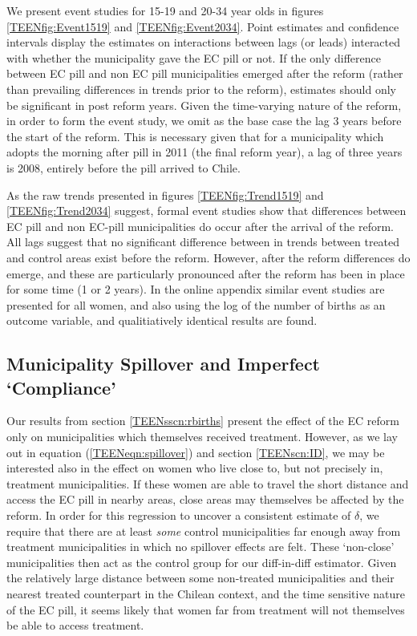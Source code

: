 We present event studies for 15-19 and 20-34 year olds in figures 
\ref{TEENfig:Event1519} and \ref{TEENfig:Event2034}.  Point estimates and 
confidence intervals display the estimates on interactions between lags (or 
leads) interacted with whether the municipality gave the EC pill or not.  If the
only difference between EC pill and non EC pill municipalities emerged after the
reform (rather than prevailing differences in trends prior to the reform), 
estimates should only be significant in post reform years. Given the time-varying
nature of the reform, in order to form the event study, we omit as the base case
the lag 3 years before the start of the reform.  This is necessary given that for
a municipality which adopts the morning after pill in 2011 (the final reform 
year), a lag of three years is 2008, entirely before the pill arrived to Chile.

As the raw trends presented in figures \ref{TEENfig:Trend1519} and 
\ref{TEENfig:Trend2034} suggest, formal event studies show that differences 
between EC pill and non EC-pill municipalities do occur after the arrival of the
reform.  All lags suggest that no significant difference between in trends
between treated and control areas exist before the reform.  However, after the
reform differences do emerge, and these are particularly pronounced after the
reform has been in place for some time (1 or 2 years).  In the online appendix
similar event studies are presented for all women, and also using the log of the
number of births as an outcome variable, and qualitiatively identical results are
found.

\subsection{Municipality Spillover and Imperfect `Compliance'}
\label{TEENsscn:spillover}
Our results from section \ref{TEENsscn:rbirths} present the effect of the EC
reform only on municipalities which themselves received treatment.  However,
as we lay out in equation (\ref{TEENeqn:spillover}) and section \ref{TEENscn:ID},
we may be interested also in the effect on women who live close to, but not
precisely in, treatment municipalities.  If these women are able to travel the
short distance and access the EC pill in nearby areas, close areas may themselves
be affected by the reform.  In order for this regression to uncover a consistent
estimate of $\delta$, we require that there are at least \emph{some} control
municipalities far enough away from treatment municipalities in which no spillover
effects are felt.  These `non-close' municipalities then act as the control group
for our diff-in-diff estimator.  Given the relatively large distance between some
non-treated municipalities and their nearest treated counterpart in the Chilean
context, and the time sensitive nature of the EC pill, it seems likely that women
far from treatment will not themselves be able to access treatment.

